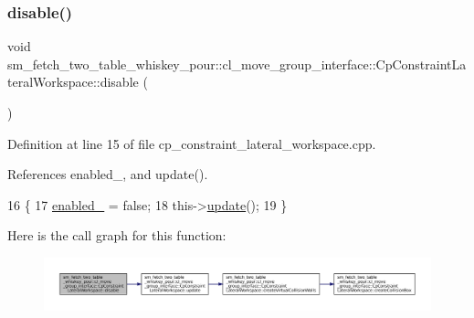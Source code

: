 \subsubsection{\texorpdfstring{disable()}{disable()}}
{\footnotesize\ttfamily void sm\+\_\+fetch\+\_\+two\+\_\+table\+\_\+whiskey\+\_\+pour\+::cl\+\_\+move\+\_\+group\+\_\+interface\+::\+Cp\+Constraint\+Lateral\+Workspace\+::disable (\begin{DoxyParamCaption}{ }\end{DoxyParamCaption})}



Definition at line 15 of file cp\+\_\+constraint\+\_\+lateral\+\_\+workspace.\+cpp.



References enabled\+\_\+, and update().


\begin{DoxyCode}
16         \{
17             \hyperlink{classsm__fetch__two__table__whiskey__pour_1_1cl__move__group__interface_1_1CpConstraintLateralWorkspace_a5a7dd0aa75d38aa540c88b0b7da347ec}{enabled\_} = \textcolor{keyword}{false};
18             this->\hyperlink{classsm__fetch__two__table__whiskey__pour_1_1cl__move__group__interface_1_1CpConstraintLateralWorkspace_afbbf07ecc60348ce0f40f6aa0c6fd6f3}{update}();
19         \}
\end{DoxyCode}
Here is the call graph for this function\+:
\nopagebreak
\begin{figure}[H]
\begin{center}
\leavevmode
\includegraphics[width=350pt]{classsm__fetch__two__table__whiskey__pour_1_1cl__move__group__interface_1_1CpConstraintLateralWorkspace_a7c8d663804f6edc1d3c79a0e37f9a82f_cgraph}
\end{center}
\end{figure}
\mbox{\label{classsm__fetch__two__table__whiskey__pour_1_1cl__move__group__interface_1_1CpConstraintLateralWorkspace_a35dcb27d6434d98e73c0cbe5ddf88bca}} 
